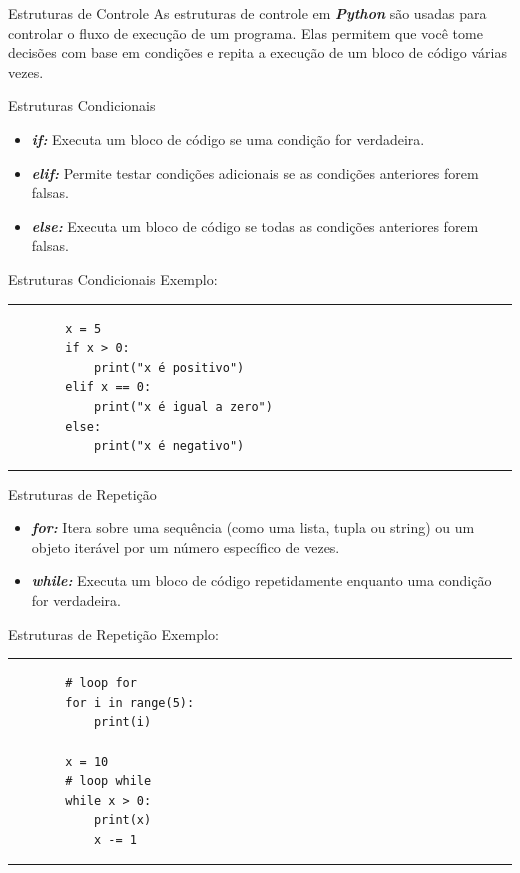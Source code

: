 \documentclass{beamer}
\begin{document}
\begin{frame}{Estruturas de Controle}
	\label{estruturas_controle}
	As estruturas de controle em \textbf{\textit{Python}} são usadas para controlar o fluxo de execução de um programa. Elas permitem que você tome decisões com base em condições e repita a execução de um bloco de código várias vezes.
\end{frame}

\begin{frame}[fragile]{Estruturas Condicionais}
	\label{estruturas_condicionl}
	\begin{itemize}
		\item  \textbf{\textit{if:}} Executa um bloco de código se uma condição for verdadeira.
		\item \textbf{\textit{elif:}} Permite testar condições adicionais se as condições anteriores forem falsas.
		\item \textbf{\textit{else:}} Executa um bloco de código se todas as condições anteriores forem falsas.
	\end{itemize}
\end{frame}

\begin{frame}[fragile]{Estruturas Condicionais}
	\label{estruturas_condicionl_exemplo}
	Exemplo:
	\rule{\textwidth}{1pt}
	\scriptsize
	\begin{verbatim}
		x = 5
		if x > 0:
			print("x é positivo")
		elif x == 0:
			print("x é igual a zero")
		else:
			print("x é negativo")
	\end{verbatim}
	\rule{\textwidth}{1pt}
\end{frame}


\begin{frame}[fragile]{Estruturas de Repetição}
	\label{estruturas_repeticao}
	\begin{itemize}
		\item  \textbf{\textit{for:}} Itera sobre uma sequência (como uma lista, tupla ou string) ou um objeto iterável por um número específico de vezes.
		\item \textbf{\textit{while:}} Executa um bloco de código repetidamente enquanto uma condição for verdadeira.
	\end{itemize}
\end{frame}

\begin{frame}[fragile]{Estruturas de Repetição}
	\label{estruturas_repeticao_exemplo}
	Exemplo:
	\rule{\textwidth}{1pt}
	\scriptsize	
	\begin{verbatim}
		# loop for
		for i in range(5):
			print(i)
		
		x = 10
		# loop while
		while x > 0:
			print(x)
			x -= 1
	\end{verbatim}
	\rule{\textwidth}{1pt}
	
\end{frame}
\end{document}
